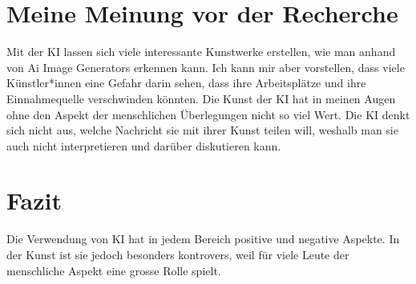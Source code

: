 \documentclass{article}
\begin{document}
\section{Meine Meinung vor der Recherche}
    Mit der KI lassen sich viele interessante Kunstwerke erstellen, wie man anhand von Ai Image 
    Generators erkennen kann. Ich kann mir aber vorstellen, dass viele Künstler*innen eine Gefahr 
    darin sehen, dass ihre Arbeitsplätze und ihre Einnahmequelle verschwinden könnten. Die Kunst der KI 
    hat in meinen Augen ohne den Aspekt der menschlichen Überlegungen nicht so viel Wert. Die KI denkt 
    sich nicht aus, welche Nachricht sie mit ihrer Kunst teilen will, weshalb man sie auch nicht 
    interpretieren und darüber diskutieren kann.

\section{Fazit}
    Die Verwendung von KI hat in jedem Bereich positive und negative Aspekte. In der Kunst ist sie jedoch 
    besonders kontrovers, weil für viele Leute der menschliche Aspekt eine grosse Rolle spielt.



\printbibliography
\end{document}
